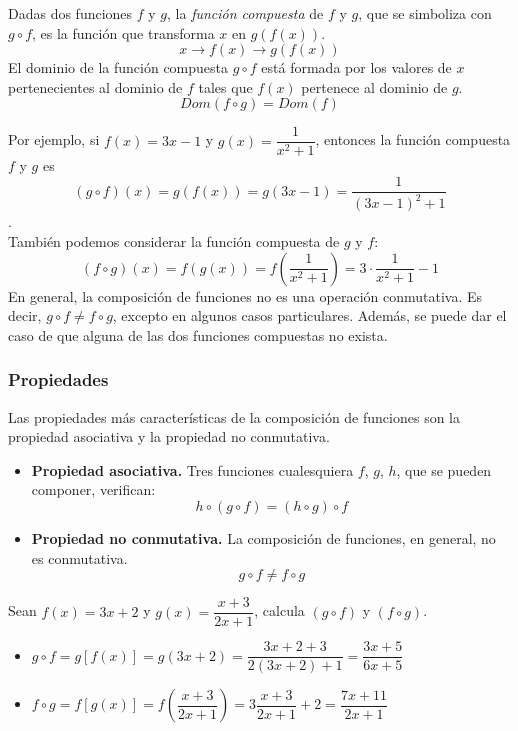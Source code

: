 
\begin{definition}
Dadas dos funciones $f$ y $g$, la \emph{función compuesta} de $f$ y $g$, que se simboliza con $g \circ f$, es la función que transforma $x$ en $g(f(x))$.
$$ x \rightarrow f(x) \rightarrow g(f(x))$$
El dominio de la función compuesta $g \circ f$ está formada por los valores de $x$ pertenecientes al dominio de $f$ tales que $f(x)$ pertenece al dominio de $g$.
$$Dom(f \circ g) = Dom(f)$$
\end{definition}
Por ejemplo, si $f(x) = 3x - 1$ y $g(x) = \dfrac{1}{x^{2}+1}$, entonces la función compuesta $f$ y $g$ es $$(g \circ f)(x) = g(f(x)) = g(3x-1) = \dfrac{1}{(3x-1)^{2}+1}$$.\\
También podemos considerar la función compuesta de $g$ y $f$:
$$(f \circ g)(x) = f(g(x)) = f(\dfrac{1}{x^2 + 1}) = 3 \cdot \dfrac{1}{x^2 + 1} - 1$$
En general, la composición de funciones no es una operación conmutativa. Es decir, $g \circ f \neq f \circ g$, excepto en algunos casos particulares. Además, se puede dar el caso de que alguna de las dos funciones compuestas no exista.
\subsubsection{Propiedades}
Las propiedades más características de la composición de funciones son la propiedad asociativa y la propiedad no conmutativa.
\begin{itemize}
	\item \textbf{Propiedad asociativa.} Tres funciones cualesquiera $f$, $g$, $h$, que se pueden componer, verifican:
	$$h \circ (g \circ f) = (h \circ g) \circ f$$
	\item \textbf{Propiedad no conmutativa.} La composición de funciones, en general, no es conmutativa.
	$$g \circ f \neq f \circ g$$
\end{itemize}

\begin{ex}
	Sean $f(x)=3x+2$ y $g(x)=\dfrac{x+3}{2x+1}$, calcula $(g \circ f)$ y $(f \circ g)$.
	\begin{sol}
		\begin{itemize}
			\item $g \circ f = g[f(x)] = g(3x+2) = \dfrac{3x+2+3}{2(3x+2)+1} = \dfrac{3x+5}{6x+5}$
			\item $f \circ g = f[g(x)] = f(\dfrac{x+3}{2x+1}) = 3\dfrac{x+3}{2x+1} + 2=\dfrac{7x+11}{2x+1}$
		\end{itemize}
	\end{sol}
\end{ex}

